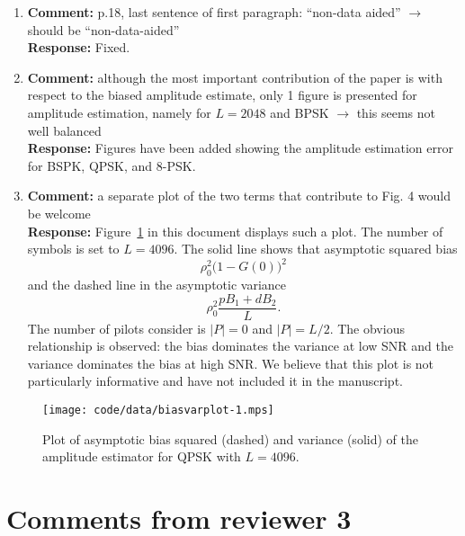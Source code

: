\documentclass{article}
\newcommand{\abs}[1]{{\left\vert #1 \right\vert}}
\begin{document}
\begin{enumerate}
\item \textbf{Comment:} p.18, last sentence of first paragraph: ``non-data aided'' $\to$ should be ``non-data-aided''  \\
\textbf{Response:} Fixed.

\item \textbf{Comment:}  although the most important contribution of the paper is with respect to the biased amplitude estimate, only 1 figure is presented for amplitude estimation, namely for $L=2048$ and BPSK $\to$ this seems not well balanced  \\
\textbf{Response:} Figures have been added showing the amplitude estimation error for BSPK, QPSK, and 8-PSK.

\item \textbf{Comment:}  a separate plot of the two terms that contribute to Fig. 4 would be welcome \\

\textbf{Response:} Figure~\ref{fig:biasvarcomp} in this document displays such a plot.  The number of symbols is set to $L=4096$.  The solid line shows that asymptotic squared bias 
\[
\rho_0^2\big(1 - G(0)\big)^2
\]
and the dashed line in the asymptotic variance
\[
\rho_0^2\frac{p B_1 + d B_2}{L}.
\]
The number of pilots consider is $\abs{P}=0$ and $\abs{P}=L/2$.  The obvious relationship is observed: the bias dominates the variance at low SNR and the variance dominates the bias at high SNR.  We believe that this plot is not particularly informative and have not included it in the manuscript.
  
\end{enumerate} 

\begin{figure}[tp] 
	\centering  
		\texttt{[image: code/data/biasvarplot-1.mps]}
		\caption{Plot of asymptotic bias squared (dashed) and variance (solid) of the amplitude estimator for QPSK with $L=4096$.}
		\label{fig:biasvarcomp}
\end{figure}


\section{Comments from reviewer 3}
\end{document}
